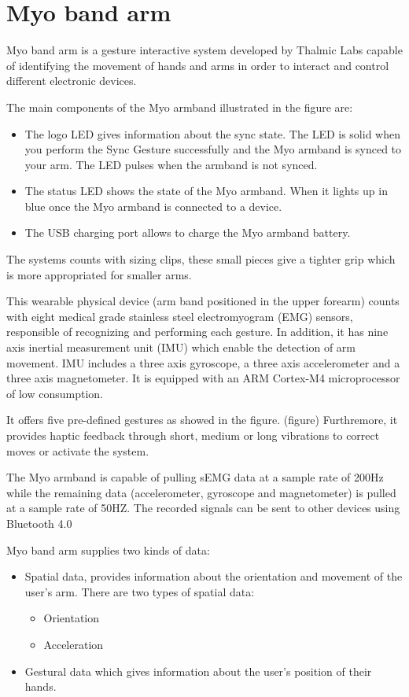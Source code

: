 \section{Myo band arm}

Myo band arm is a gesture interactive system developed by Thalmic Labs capable of identifying the movement of hands and arms in order to interact and control different electronic devices.


The main components of the Myo armband illustrated in the figure %
are:
\begin{itemize}
\item The logo LED gives information about the sync state. The LED is solid when you perform the Sync Gesture successfully and
the Myo armband is synced to your arm. The LED pulses when the armband is not synced.
\item The status LED shows the state of the Myo armband. When it lights up in blue once the Myo armband is connected to a device. 
\item The USB charging port allows to charge the Myo armband battery. 
\end{itemize}
The systems counts with sizing clips, these small pieces give a tighter grip which is more appropriated for smaller arms.

This wearable physical device (arm band positioned in the upper forearm) counts with eight medical grade stainless steel electromyogram (EMG) sensors, responsible of recognizing and performing each gesture. In addition, it has nine axis inertial measurement unit (IMU) which enable the detection of arm movement. IMU includes a three axis gyroscope,  a three axis accelerometer and a three axis magnetometer. It is equipped with an ARM Cortex-M4 microprocessor of low consumption.

It offers five pre-defined gestures as showed in the figure. (figure) Furthremore, it provides haptic feedback through short, medium or long vibrations to correct moves or activate the system.

The Myo armband is capable of pulling sEMG data at a sample rate of 200Hz while the remaining data (accelerometer, gyroscope and magnetometer) is pulled at a sample rate of  50HZ. The recorded signals can be sent to other devices using Bluetooth 4.0 

Myo band arm supplies two kinds of data:
\begin{itemize}
\item Spatial data, provides information about the orientation and movement of the user's arm. There are two types of spatial data:
\begin{itemize}
\item Orientation
\item Acceleration
\end{itemize}
\item Gestural data which gives information about the user's position of their hands.

\end{itemize}


